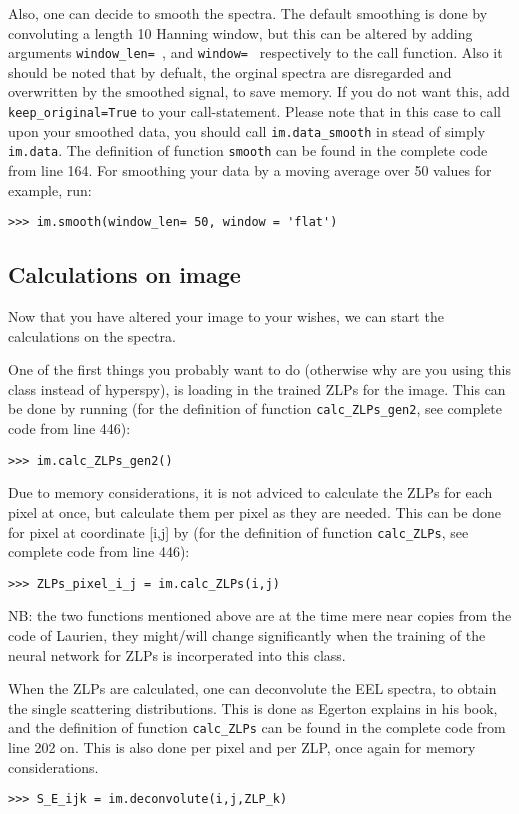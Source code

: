 \documentclass{article}
\begin{document}
Also, one can decide to smooth the spectra. The default smoothing is done by convoluting a length 10 Hanning window, but this can be altered by adding arguments \verb|window_len= |, and \verb|window= | respectively to the call function. Also it should be noted that by defualt, the orginal spectra are disregarded and overwritten by the smoothed signal, to save memory. If you do not want this, add \verb|keep_original=True| to your call-statement. Please note that in this case to call upon your smoothed data, you should call \verb|im.data_smooth| in stead of simply \verb|im.data|. The definition of function \verb|smooth| can be found in the complete code from line 164. For smoothing your data by a moving average over 50 values for example, run:

\begin{lstlisting}
>>> im.smooth(window_len= 50, window = 'flat')
\end{lstlisting}

\subsection{Calculations on image}
Now that you have altered your image to your wishes, we can start the calculations on the spectra.

One of the first things you probably want to do (otherwise why are you using this class instead of hyperspy), is loading in the trained ZLPs for the image. This can be done by running  (for the definition of function \verb|calc_ZLPs_gen2|, see complete code from line 446):

\begin{lstlisting}
>>> im.calc_ZLPs_gen2()
\end{lstlisting}

Due to memory considerations, it is not adviced to calculate the ZLPs for each pixel at once, but calculate them per pixel as they are needed. This can be done for pixel at coordinate [i,j] by (for the definition of function \verb|calc_ZLPs|, see complete code from line 446):
\begin{lstlisting}
>>> ZLPs_pixel_i_j = im.calc_ZLPs(i,j)
\end{lstlisting}

NB: the two functions mentioned above are at the time mere near copies from the code of Laurien, they might/will change significantly when the training of the neural network for ZLPs is incorperated into this class. 

When the ZLPs are calculated, one can deconvolute the EEL spectra, to obtain the single scattering distributions. This is done as Egerton explains in his book, and the definition of function \verb|calc_ZLPs| can be found in the complete code from line 202 on. This is also done per pixel and per ZLP, once again for memory considerations.
\begin{lstlisting}
>>> S_E_ijk = im.deconvolute(i,j,ZLP_k)
\end{lstlisting}
\end{document}
